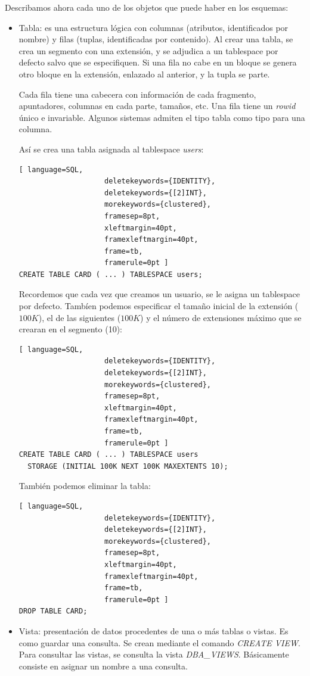 Describamos ahora cada uno de los objetos que puede haber en los esquemas:
\begin{itemize}
\item Tabla: es una estructura lógica con columnas (atributos, identificados por nombre) y filas (tuplas, identificadas por contenido). Al crear una tabla, se crea un segmento con una extensión, y se adjudica a un tablespace por defecto salvo que se especifiquen. Si una fila no cabe en un bloque se genera otro bloque en la extensión, enlazado al anterior, y la tupla se parte.

Cada fila tiene una cabecera con información de cada fragmento, apuntadores, columnas en cada parte, tamaños, etc. Una fila tiene un \textit{rowid} único e invariable. Algunos sistemas admiten el tipo tabla como tipo para una columna.

\begin{example}
Así se crea una tabla asignada al tablespace \textit{users}:
\begin{lstlisting}[ language=SQL,
                    deletekeywords={IDENTITY},
                    deletekeywords={[2]INT},
                    morekeywords={clustered},
                    framesep=8pt,
                    xleftmargin=40pt,
                    framexleftmargin=40pt,
                    frame=tb,
                    framerule=0pt ]
CREATE TABLE CARD ( ... ) TABLESPACE users;
\end{lstlisting}
Recordemos que cada vez que creamos un usuario, se le asigna un tablespace por defecto. Tambíen podemos especificar el tamaño inicial de la extensión ($100K$), el de las siguientes ($100K$) y el número de extensiones máximo que se crearan en el segmento (10):
\begin{lstlisting}[ language=SQL,
                    deletekeywords={IDENTITY},
                    deletekeywords={[2]INT},
                    morekeywords={clustered},
                    framesep=8pt,
                    xleftmargin=40pt,
                    framexleftmargin=40pt,
                    frame=tb,
                    framerule=0pt ]
CREATE TABLE CARD ( ... ) TABLESPACE users 
  STORAGE (INITIAL 100K NEXT 100K MAXEXTENTS 10);
\end{lstlisting}
También podemos eliminar la tabla:
\begin{lstlisting}[ language=SQL,
                    deletekeywords={IDENTITY},
                    deletekeywords={[2]INT},
                    morekeywords={clustered},
                    framesep=8pt,
                    xleftmargin=40pt,
                    framexleftmargin=40pt,
                    frame=tb,
                    framerule=0pt ]
DROP TABLE CARD;
\end{lstlisting}
\end{example}
\item Vista: presentación de datos procedentes de una o más tablas o vistas. Es como guardar una consulta. Se crean mediante el comando \textit{CREATE VIEW}. Para consultar las vistas, se consulta la vista \textit{DBA\_VIEWS}. Básicamente consiste en asignar un nombre a una consulta.


\end{itemize}
